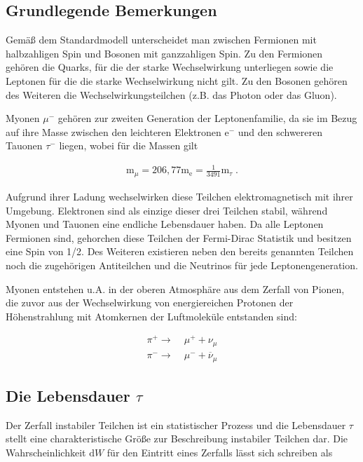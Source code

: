 \subsection{Grundlegende Bemerkungen}
Gemäß dem Standardmodell unterscheidet man zwischen Fermionen mit halbzahligen Spin und Bosonen mit ganzzahligen Spin. Zu den Fermionen gehören die Quarks, für die der starke Wechselwirkung unterliegen sowie die Leptonen für die die starke Wechselwirkung nicht gilt. Zu den Bosonen gehören des Weiteren die Wechselwirkungsteilchen (z.B. das Photon oder das Gluon).

Myonen $\mu^-$ gehören zur zweiten Generation der Leptonenfamilie, da sie im Bezug auf ihre Masse zwischen den leichteren Elektronen $\textrm{e}^-$ und den schwereren Tauonen $\tau^-$ liegen, wobei für die Massen gilt

\begin{align}
\textrm{m}_\mu = 206,77 \textrm{m}_{\textrm{e}} = \frac{1}{3491}\textrm{m}_{\tau}\;.
\end{align}

Aufgrund ihrer Ladung wechselwirken diese Teilchen elektromagnetisch mit ihrer Umgebung. Elektronen sind als einzige dieser drei Teilchen stabil, während Myonen und Tauonen eine endliche Lebensdauer haben. Da alle Leptonen Fermionen sind, gehorchen diese Teilchen der Fermi-Dirac Statistik und besitzen eine Spin von 1/2. Des Weiteren existieren neben den bereits genannten Teilchen noch die zugehörigen Antiteilchen und die Neutrinos für jede Leptonengeneration.

Myonen entstehen u.A. in der oberen Atmosphäre aus dem Zerfall von Pionen, die zuvor aus der Wechselwirkung von energiereichen Protonen der Höhenstrahlung mit Atomkernen der Luftmoleküle entstanden sind:

\begin{align}
\pi^+ \longrightarrow &\; \mu^+ + \nu_\mu \\
\pi^- \longrightarrow &\; \mu^- + \overline{\nu}_\mu 
\end{align}

\subsection{Die Lebensdauer $\tau$}
Der Zerfall instabiler Teilchen ist ein statistischer Prozess und die Lebensdauer $\tau$ stellt eine charakteristische Größe zur Beschreibung instabiler Teilchen dar. Die Wahrscheinlichkeit $\textrm{d}W$ für den Eintritt eines Zerfalls lässt sich schreiben als
 
